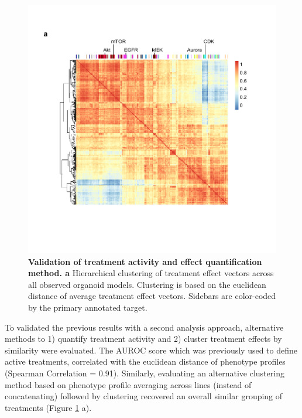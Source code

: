 \begin{flushleft}
\begin{figure}[h!]
\centering
\includegraphics[width=\textwidth,
                height=\textheight,
                keepaspectratio]{figures/promise/pdf/fig_3_2.pdf}
\caption[Validation of treatment activity and effect quantification method]{\textbf{Validation of treatment activity and effect quantification method. a} Hierarchical clustering of treatment effect vectors across all observed organoid models. Clustering is based on the euclidean distance of average treatment effect vectors. Sidebars are color-coded by the primary annotated target.}
\label{fig_232}
\end{figure}
\bigbreak

To validated the previous results with a second analysis approach, alternative methods to 1) quantify treatment activity and 2) cluster treatment effects by similarity were evaluated. The AUROC score which was previously used to define active treatments, correlated with the euclidean distance of phenotype profiles (Spearman Correlation = 0.91). Similarly, evaluating an alternative clustering method based on phenotype profile averaging across lines (instead of concatenating) followed by clustering recovered an overall similar grouping of treatments (Figure \ref{fig_232} a). 

\newpage


\end{flushleft}

